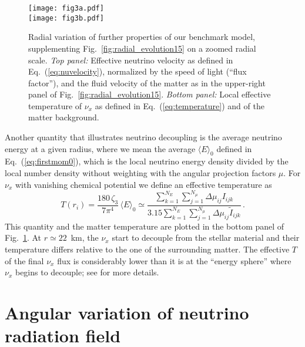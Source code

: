 \documentclass[iop,twocolappendix,numberedappendix]{emulateapj}
\begin{document}
\begin{figure}
\begin{center}
 \texttt{[image: fig3a.pdf]}\\[1ex]
 \texttt{[image: fig3b.pdf]}
  \caption{Radial variation of further properties of our benchmark model,
  supplementing Fig.~\ref{fig:radial_evolution15} on a zoomed
  radial scale. {\em Top panel:} Effective neutrino velocity as defined in
  Eq.~(\ref{eq:nuvelocity}), normalized by the speed of light (``flux factor''),
  and the fluid velocity of the matter as in the
  upper-right panel of Fig.~\ref{fig:radial_evolution15}.
  {\em Bottom panel:} Local effective temperature of $\nu_x$ as defined
  in Eq.~(\ref{eq:temperature}) and of the matter background.}
  \label{fig:nuvelocity}
\end{center}
\end{figure}

Another quantity that illustrates neutrino decoupling is the average neutrino
energy at a given radius, where we mean the average $\langle E\rangle_0$
defined in Eq.~(\ref{eq:firstmom0}), which is the local neutrino energy
density divided by the local number density without weighting with the angular
projection factors $\mu$. For $\nu_x$ with vanishing chemical potential we define
an effective temperature as
\begin{equation}
\label{eq:temperature}
T(r_i)=\frac{180\,\zeta_3}{7\pi^4}\,\langle E\rangle_0\simeq
\frac{\sum_{k=1}^{N_E} \sum_{j=1}^{N_{\mu}} \Delta\mu_{ij} I_{ijk}}{3.15
\sum_{k=1}^{N_E} \sum_{j=1}^{N_{\mu}} \Delta\mu_{ij} \tilde{I}_{ijk}}\,.
\end{equation}
This quantity and the matter temperature are plotted in the
bottom panel of Fig.~\ref{fig:nuvelocity}. At $r\simeq 22$~km, the $\nu_x$
start to decouple from the stellar material and their temperature differs
relative to the one of the surrounding matter. The effective $T$ of the
final $\nu_x$ flux is considerably lower than it is at the ``energy
sphere'' where $\nu_x$ begins to decouple; see \cite{Keil:2002in} for more
details.
\vspace{1cm}

\section{Angular variation of neutrino radiation field}\label{sec:angles}
\end{document}
